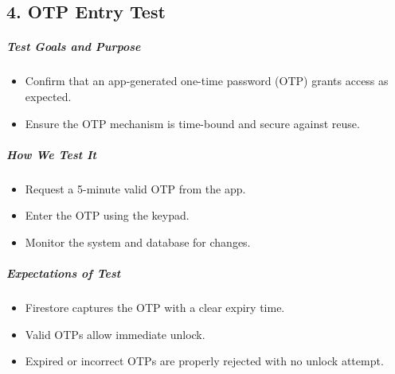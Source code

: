 \subsection*{4. OTP Entry Test}
\subparagraph{Test Goals and Purpose}
\begin{itemize}
    \item Confirm that an app-generated one-time password (OTP) grants access as expected.
    \item Ensure the OTP mechanism is time-bound and secure against reuse.
\end{itemize}
\subparagraph{How We Test It}
\begin{itemize}
    \item Request a 5-minute valid OTP from the app.
    \item Enter the OTP using the keypad.
    \item Monitor the system and database for changes.
\end{itemize}
\subparagraph{Expectations of Test}
\begin{itemize}
    \item Firestore captures the OTP with a clear expiry time.
    \item Valid OTPs allow immediate unlock.
    \item Expired or incorrect OTPs are properly rejected with no unlock attempt.
\end{itemize}

